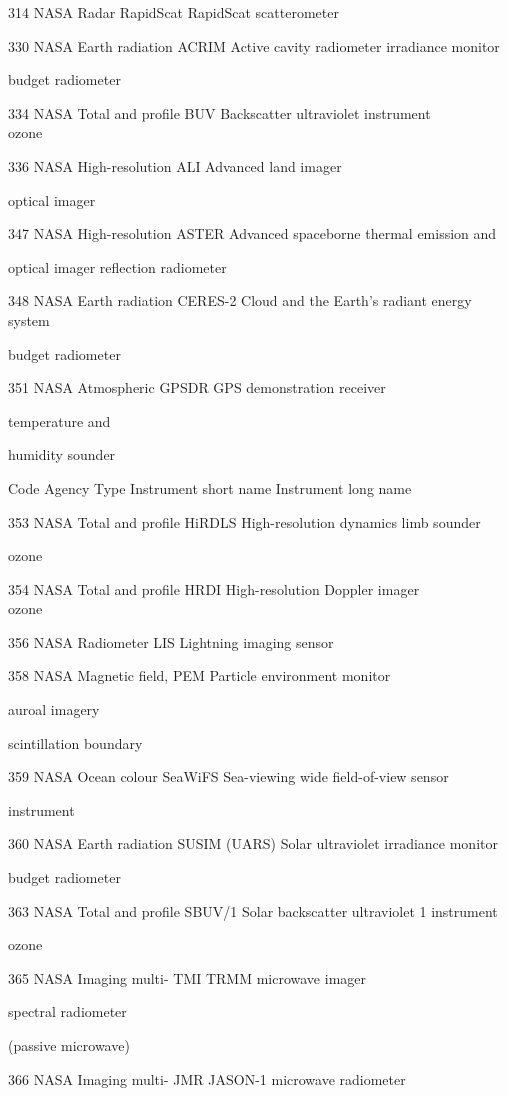 314 NASA Radar RapidScat RapidScat scatterometer

330 NASA Earth radiation ACRIM Active cavity radiometer irradiance monitor

budget radiometer

334 NASA Total and profile BUV Backscatter ultraviolet instrument\\
ozone

336 NASA High-resolution ALI Advanced land imager

optical imager

347 NASA High-resolution ASTER Advanced spaceborne thermal emission and

optical imager reflection radiometer

348 NASA Earth radiation CERES-2 Cloud and the Earth's radiant energy system

budget radiometer

351 NASA Atmospheric GPSDR GPS demonstration receiver

temperature and

humidity sounder

Code Agency Type Instrument short name Instrument long name

353 NASA Total and profile HiRDLS High-resolution dynamics limb sounder

ozone

354 NASA Total and profile HRDI High-resolution Doppler imager\\
ozone

356 NASA Radiometer LIS Lightning imaging sensor

358 NASA Magnetic field, PEM Particle environment monitor

auroal imagery

scintillation boundary

359 NASA Ocean colour SeaWiFS Sea-viewing wide field-of-view sensor

instrument

360 NASA Earth radiation SUSIM (UARS) Solar ultraviolet irradiance monitor

budget radiometer

363 NASA Total and profile SBUV/1 Solar backscatter ultraviolet 1 instrument

ozone

365 NASA Imaging multi- TMI TRMM microwave imager

spectral radiometer

(passive microwave)

366 NASA Imaging multi- JMR JASON-1 microwave radiometer

